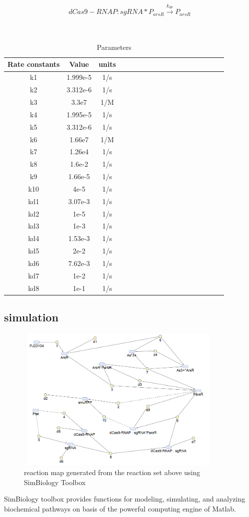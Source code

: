 \begin{equation}
dCas9-RNAP:sgRNA*P_{arsR}\stackrel{k_{d8}}{\longrightarrow}P_{arsR}
\end{equation}
\\\\
\begin{table}[htbp]
	\centering
	\caption{\label {tab:test} Parameters}
	\begin{tabular}{cccccccccccccccccc}
		\toprule
		Rate constants & Value& units \\
		\midrule
		k1 & 1.999e-5 &1/s \\
		k2 & 3.312e-6 &1/s \\
		k3 & 3.3e7    & 1/M    \\
		k4 &1.995e-5 &1/s\\
		k5 & 3.312e-6 &1/s \\
		k6 &1.66e7   &1/M  \\
		k7  &1.26e4 &1/s  \\
		k8&1.6e-2& 1/s\\
		k9 &1.66e-5&1/s\\ 
		k10&4e-5&1/s\\
		kd1 & 3.07e-3&1/s\\
		kd2&1e-5&1/s\\
		kd3&1e-3&1/s\\
		kd4&1.53e-3&1/s\\
		kd5 & 2e-2&1/s\\
		kd6&7.62e-3&1/s\\
		kd7& 1e-2&1/s\\
		kd8&1e-1&1/s\\		
		\bottomrule
	\end{tabular}
\end{table}



\subsection{simulation }
\begin{figure}[h]
	\centering
	\includegraphics[width=10cm,height=7cm]{screenshot003}	
	\caption{reaction map generated from the reaction set above using SimBiology Toolbox}
\end{figure}
SimBiology toolbox provides functions for modeling, simulating, and analyzing biochemical pathways on basis of the powerful computing engine of Matlab.

